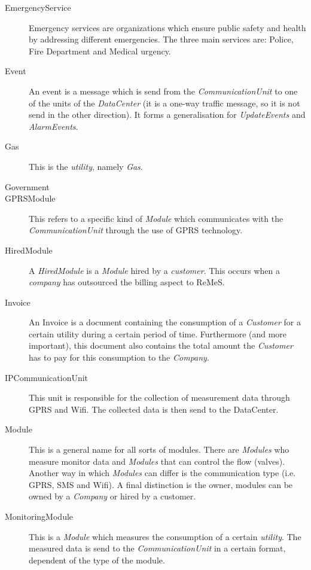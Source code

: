 \begin{description}
\item[EmergencyService] Emergency services are organizations which ensure public
safety and health by addressing different emergencies. The three main services
are: Police, Fire Department and Medical urgency.

\item[Event] An event is a message which is send from the
\emph{CommunicationUnit} to one of the units of the \emph{DataCenter} (it is a
one-way traffic message, so it is not send in the other direction). It forms a
generalisation for \emph{UpdateEvents} and \emph{AlarmEvents}.

\item[Gas] This is the \emph{utility}, namely \emph{Gas}.

\item[Government] %

\item[GPRSModule] This refers to a specific kind of \emph{Module} which
communicates with the \emph{CommunicationUnit} through the use of GPRS
technology.

\item[HiredModule] A \emph{HiredModule} is a \emph{Module} hired by a
\emph{customer}. This occurs when a \emph{company} has outsourced the billing
aspect to ReMeS.

\item[Invoice] An Invoice is a document containing the consumption of a
\emph{Customer} for a certain utility during a certain period of time.
Furthermore (and more important), this document also contains the total amount
the \emph{Customer} has to pay for this consumption to the \emph{Company}.

\item[IPCommunicationUnit] This unit is responsible for the collection of
measurement data through GPRS and Wifi. The collected data is then send to the
DataCenter.

\item[Module] This is a general name for all sorts of modules.
There are \emph{Modules} who measure monitor data and \emph{Modules} that can
control the flow (valves). Another way in which \emph{Modules} can differ is the
communication type (i.e. GPRS, SMS and Wifi). A final distinction is the owner,
modules can be owned by a \emph{Company} or hired by a customer.

\item[MonitoringModule] This is a \emph{Module} which measures the consumption
of a certain \emph{utility}. The measured data is send to the
\emph{CommunicationUnit} in a certain format, dependent of the type of the
module.


\end{description}
